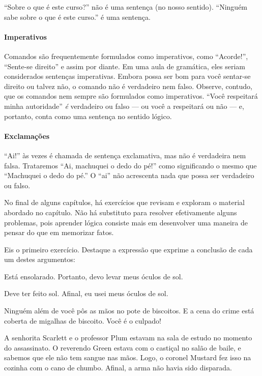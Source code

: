 \textquotedblleft Sobre o que é este curso?\textquotedblright{} não é uma sentença (no nosso sentido). \textquotedblleft Ninguém sabe sobre o que é este curso.\textquotedblright{} é uma sentença.

\paragraph{Imperativos} Comandos são frequentemente formulados como imperativos, como \textquotedblleft Acorde!\textquotedblright{}, \textquotedblleft Sente-se direito\textquotedblright{} e assim por diante. Em uma aula de gramática, eles seriam considerados sentenças imperativas. Embora possa ser bom para você sentar-se direito ou talvez não, o comando não é verdadeiro nem falso. Observe, contudo, que os comandos nem sempre são formulados como imperativos. \textquotedblleft Você respeitará minha autoridade\textquotedblright{} \emph{é} verdadeiro ou falso — ou você a respeitará ou não — e, portanto, conta como uma sentença no sentido lógico.

\paragraph{Exclamações} \textquotedblleft Ai!\textquotedblright{} às vezes é chamada de sentença exclamativa, mas não é verdadeira nem falsa. Trataremos \textquotedblleft Ai, machuquei o dedo do pé!\textquotedblright{} como significando o mesmo que \textquotedblleft Machuquei o dedo do pé.\textquotedblright{} O \textquotedblleft ai\textquotedblright{} não acrescenta nada que possa ser verdadeiro ou falso.


\practiceproblems
No final de alguns capítulos, há exercícios que revisam e exploram o material abordado no capítulo. Não há substituto para resolver efetivamente alguns problemas, pois aprender lógica consiste mais em desenvolver uma maneira de pensar do que em memorizar fatos.

\medskip

Eis o primeiro exercício. Destaque a expressão que exprime a conclusão de cada um destes argumentos:
\begin{compactlist}
	\item Está ensolarado. Portanto, devo levar meus óculos de sol.
	\item Deve ter feito sol. Afinal, eu usei meus óculos de sol.
	\item Ninguém além de você pôs as mãos no pote de biscoitos. E a cena do crime está coberta de migalhas de biscoito. Você é o culpado!
	\item A senhorita Scarlett e o professor Plum estavam na sala de estudo no
	momento do assassinato. O reverendo Green estava com o castiçal no
	salão de baile, e sabemos que ele não tem sangue nas mãos. Logo, o
	coronel Mustard fez isso na cozinha com o cano de chumbo.
	Afinal, a arma não havia sido disparada.
\end{compactlist}


